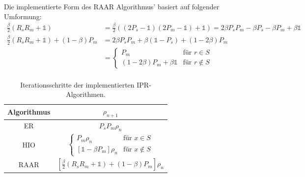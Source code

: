 Die implementierte Form des RAAR Algorithmus' basiert auf folgender Umformung:
\begin{align*}
	\frac{\beta}{2}\left(R_sR_m+\mathbb{1}\right)
	                              & =\frac{\beta}{2}\left((2P_s-\mathbb{1})(2P_m-\mathbb{1})+\mathbb{1}\right) 
	=2\beta P_sP_m-\beta P_s-\beta P_m+\beta\mathbb{1}\\
	\frac{\beta}{2}\left(R_sR_m+\mathbb{1}\right)+\left(1-\beta\right) P_m
	                              & =2\beta P_sP_m+\beta (\mathbb{1}-P_s)+ (1-2\beta)P_m                       \\
	                              & =                                                                          
	\begin{cases}
	P_m                           & \text{für } r\in S                                                        \\
	(1-2\beta)P_m+\beta\mathbb{1} & \text{für } r\notin S                                                     
	\end{cases}\\
\end{align*}
\begin{table}
	\centering
	\begin{tabular}{cc}
		\hline\hline
		Algorithmus                             & $\rho_{n+1}$                                                                               \\ 							
		\hline
		ER                                      & $P_sP_m\rho_n$                                                                             \\ 								
		HIO                                     & $\begin{cases}                                                                             
		P_m\rho_n                               & \text{für } x\in S                                                                        \\
		\left[\mathbb{1}-\beta P_m\right]\rho_n & \text{für } x\notin S                                                                     
		\end{cases}$\\
		RAAR                                    & $\left[\frac{\beta}{2}\left(R_sR_m+\mathbb{1}\right)+\left(1-\beta\right)P_m\right]\rho_n$ \\																
		\hline\hline
	\end{tabular}
	\caption[IPR-Algorithmen]{Iterationsschritte der implementierten IPR-Algorithmen.}
	\label{tab:ipr}
\end{table}	


